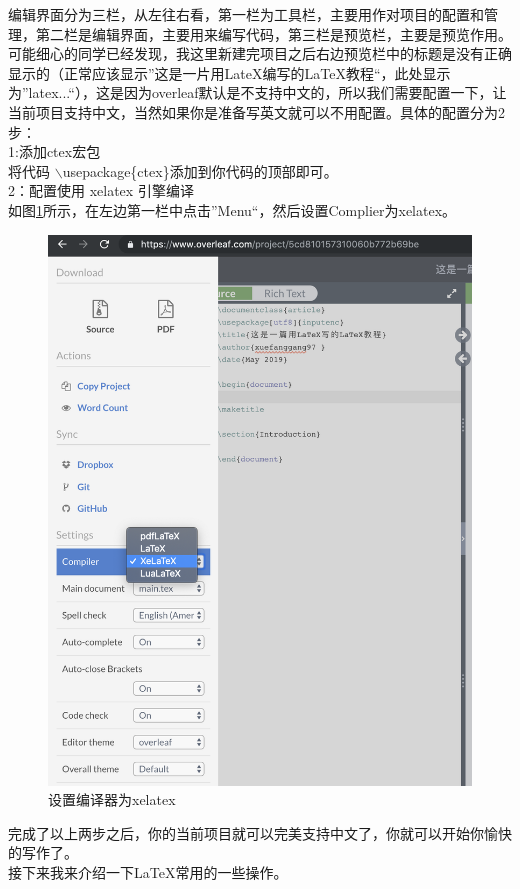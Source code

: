 \documentclass{article}
\begin{document}
编辑界面分为三栏，从左往右看，第一栏为工具栏，主要用作对项目的配置和管理，第二栏是编辑界面，主要用来编写代码，第三栏是预览栏，主要是预览作用。可能细心的同学已经发现，我这里新建完项目之后右边预览栏中的标题是没有正确显示的（正常应该显示”这是一片用LateX编写的LaTeX教程“，此处显示为”latex...“），这是因为overleaf默认是不支持中文的，所以我们需要配置一下，让当前项目支持中文，当然如果你是准备写英文就可以不用配置。具体的配置分为2步：\\
1:添加ctex宏包\\
将代码 $\backslash$usepackage\{ctex\}添加到你代码的顶部即可。\\
2：配置使用 xelatex 引擎编译\\
如图\ref{set-xelatex}所示，在左边第一栏中点击”Menu“，然后设置Complier为xelatex。\\
\begin{figure}[H]
\centering
\includegraphics[width=1\textwidth]{设置编译器为xelatex.png}
\caption{设置编译器为xelatex}
\label{set-xelatex}
\end{figure}
完成了以上两步之后，你的当前项目就可以完美支持中文了，你就可以开始你愉快的写作了。\\
接下来我来介绍一下LaTeX常用的一些操作。
\end{document}
